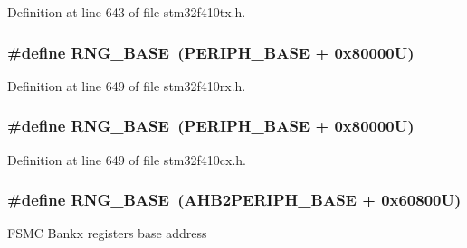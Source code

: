 Definition at line 643 of file stm32f410tx.\+h.

\subsubsection[{\texorpdfstring{R\+N\+G\+\_\+\+B\+A\+SE}{RNG_BASE}}]{\setlength{\rightskip}{0pt plus 5cm}\#define R\+N\+G\+\_\+\+B\+A\+SE~({\bf P\+E\+R\+I\+P\+H\+\_\+\+B\+A\+SE} + 0x80000\+U)}\hypertarget{group___peripheral__registers__structures_gab92662976cfe62457141e5b4f83d541c}{}\label{group___peripheral__registers__structures_gab92662976cfe62457141e5b4f83d541c}


Definition at line 649 of file stm32f410rx.\+h.

\subsubsection[{\texorpdfstring{R\+N\+G\+\_\+\+B\+A\+SE}{RNG_BASE}}]{\setlength{\rightskip}{0pt plus 5cm}\#define R\+N\+G\+\_\+\+B\+A\+SE~({\bf P\+E\+R\+I\+P\+H\+\_\+\+B\+A\+SE} + 0x80000\+U)}\hypertarget{group___peripheral__registers__structures_gab92662976cfe62457141e5b4f83d541c}{}\label{group___peripheral__registers__structures_gab92662976cfe62457141e5b4f83d541c}


Definition at line 649 of file stm32f410cx.\+h.

\subsubsection[{\texorpdfstring{R\+N\+G\+\_\+\+B\+A\+SE}{RNG_BASE}}]{\setlength{\rightskip}{0pt plus 5cm}\#define R\+N\+G\+\_\+\+B\+A\+SE~({\bf A\+H\+B2\+P\+E\+R\+I\+P\+H\+\_\+\+B\+A\+SE} + 0x60800\+U)}\hypertarget{group___peripheral__registers__structures_gab92662976cfe62457141e5b4f83d541c}{}\label{group___peripheral__registers__structures_gab92662976cfe62457141e5b4f83d541c}
F\+S\+MC Bankx registers base address 

